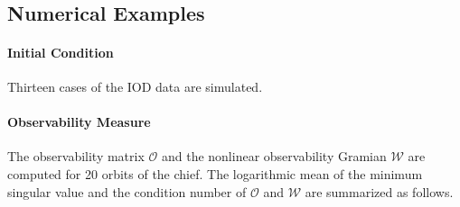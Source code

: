 \documentclass[10pt]{article}
\date{}
\begin{document}
\thispagestyle{empty}

\vspace*{0.1cm}\\
\vspace*{0.1cm}\\
\\
\\




\subsection{Numerical Examples}

\paragraph{Initial Condition}

Thirteen cases of the IOD data are simulated. 

\paragraph{Observability Measure}

The observability matrix $\mathcal{O}$ and the nonlinear observability Gramian $\mathcal{W}$ are computed for 20 orbits of the chief. The logarithmic mean of the minimum singular value and the condition number of $\mathcal{O}$ and $\mathcal{W}$ are summarized as follows.

\end{document}
